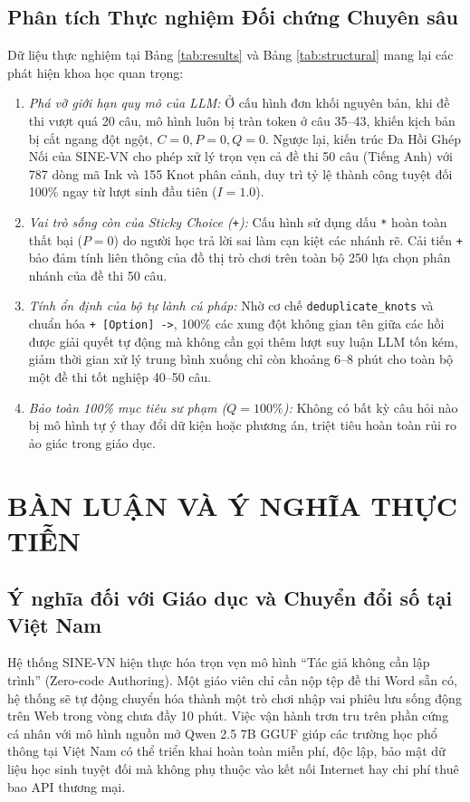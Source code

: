 \documentclass[conference]{IEEEtran}
\begin{document}
\subsection{Phân tích Thực nghiệm Đối chứng Chuyên sâu}
Dữ liệu thực nghiệm tại Bảng \ref{tab:results} và Bảng \ref{tab:structural} mang lại các phát hiện khoa học quan trọng:
\begin{enumerate}
    \item \textit{Phá vỡ giới hạn quy mô của LLM:} Ở cấu hình đơn khối nguyên bản, khi đề thi vượt quá 20 câu, mô hình luôn bị tràn token ở câu 35--43, khiến kịch bản bị cắt ngang đột ngột, $C = 0, P = 0, Q = 0$. Ngược lại, kiến trúc Đa Hồi Ghép Nối của SINE-VN cho phép xử lý trọn vẹn cả đề thi 50 câu (Tiếng Anh) với 787 dòng mã Ink và 155 Knot phân cảnh, duy trì tỷ lệ thành công tuyệt đối 100\% ngay từ lượt sinh đầu tiên ($I = 1.0$).
    \item \textit{Vai trò sống còn của Sticky Choice (\texttt{+}):} Cấu hình sử dụng dấu \texttt{*} hoàn toàn thất bại ($P = 0$) do người học trả lời sai làm cạn kiệt các nhánh rẽ. Cải tiến \texttt{+} bảo đảm tính liên thông của đồ thị trò chơi trên toàn bộ 250 lựa chọn phân nhánh của đề thi 50 câu.
    \item \textit{Tính ổn định của bộ tự lành cú pháp:} Nhờ cơ chế \texttt{deduplicate\_knots} và chuẩn hóa \texttt{+ [Option] ->}, 100\% các xung đột không gian tên giữa các hồi được giải quyết tự động mà không cần gọi thêm lượt suy luận LLM tốn kém, giảm thời gian xử lý trung bình xuống chỉ còn khoảng 6--8 phút cho toàn bộ một đề thi tốt nghiệp 40--50 câu.
    \item \textit{Bảo toàn 100\% mục tiêu sư phạm ($Q = 100\%$):} Không có bất kỳ câu hỏi nào bị mô hình tự ý thay đổi dữ kiện hoặc phương án, triệt tiêu hoàn toàn rủi ro ảo giác trong giáo dục.
\end{enumerate}

\section{BÀN LUẬN VÀ Ý NGHĨA THỰC TIỄN}
\subsection{Ý nghĩa đối với Giáo dục và Chuyển đổi số tại Việt Nam}
Hệ thống SINE-VN hiện thực hóa trọn vẹn mô hình ``Tác giả không cần lập trình'' (Zero-code Authoring). Một giáo viên chỉ cần nộp tệp đề thi Word sẵn có, hệ thống sẽ tự động chuyển hóa thành một trò chơi nhập vai phiêu lưu sống động trên Web trong vòng chưa đầy 10 phút. Việc vận hành trơn tru trên phần cứng cá nhân với mô hình nguồn mở Qwen 2.5 7B GGUF giúp các trường học phổ thông tại Việt Nam có thể triển khai hoàn toàn miễn phí, độc lập, bảo mật dữ liệu học sinh tuyệt đối mà không phụ thuộc vào kết nối Internet hay chi phí thuê bao API thương mại.
\end{document}

